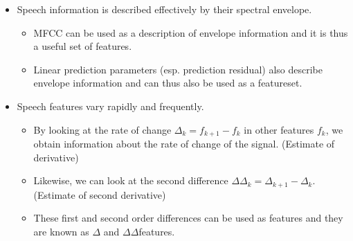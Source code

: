 \documentclass[letterpaper,10pt,english]{jupyterBook}
\begin{document}
\begin{itemize}
\begin{itemize}
\end{itemize}

\item {} 
\sphinxAtStartPar
Speech information is described effectively by their spectral
envelope.
\begin{itemize}
\item {} 
\sphinxAtStartPar
MFCC can be used as a description of envelope information and it
is thus a useful set of features.

\item {} 
\sphinxAtStartPar
Linear prediction parameters (esp. prediction residual) also
describe envelope information and can thus also be used as a
feature\sphinxhyphen{}set.

\end{itemize}

\item {} 
\sphinxAtStartPar
Speech features vary rapidly and frequently.
\begin{itemize}
\item {} 
\sphinxAtStartPar
By looking at the rate of change \(\Delta_k=f_{k+1}-f_k\) in other
features \(f_k\), we obtain information about the rate of change
of the signal. (Estimate of derivative)

\item {} 
\sphinxAtStartPar
Likewise, we can look at the second difference
\(\Delta\Delta_k=\Delta_{k+1}-\Delta_k\). (Estimate of second
derivative)

\item {} 
\sphinxAtStartPar
These first and second order differences can be used as features
and they are known as \(\Delta\)\sphinxhyphen{} and \(\Delta\Delta\)\sphinxhyphen{}features.

\end{itemize}

\end{itemize}
\end{document}
